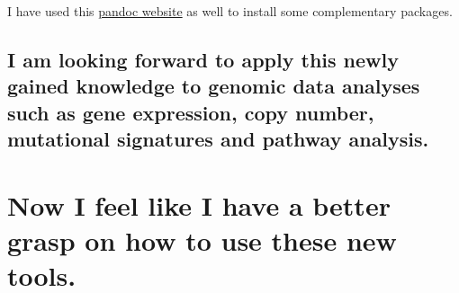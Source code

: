 \documentclass[]{article}
\begin{document}
I have used this \href{http://pandoc.org/installing.html}{pandoc
website} as well to install some complementary packages.

\subsection{I am looking forward to apply this newly gained knowledge to
genomic data analyses such as gene expression, copy number, mutational
signatures and pathway
analysis.}\label{i-am-looking-forward-to-apply-this-newly-gained-knowledge-to-genomic-data-analyses-such-as-gene-expression-copy-number-mutational-signatures-and-pathway-analysis.}

\section{Now I feel like I have a better grasp on how to use these new
tools.}\label{now-i-feel-like-i-have-a-better-grasp-on-how-to-use-these-new-tools.}
\end{document}
